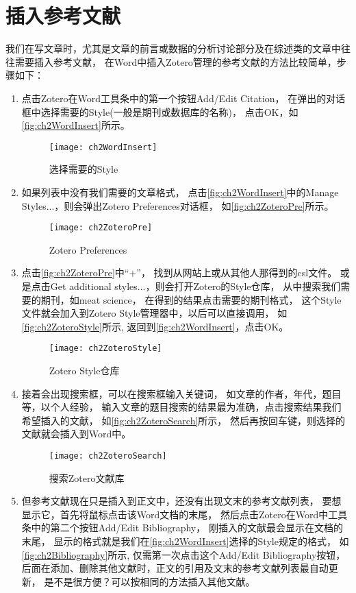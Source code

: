 \documentclass[cn,11pt,chinese]{elegantbook}
\begin{document}
		\section{插入参考文献}\label{sec:insertRef}
		我们在写文章时，尤其是文章的前言或数据的分析讨论部分及在综述类的文章中往往需要插入参考文献，
		在Word中插入Zotero管理的参考文献的方法比较简单，步骤如下：
		\begin{enumerate}
			\item
			点击Zotero在Word工具条中的第一个按钮Add/Edit Citation，
			在弹出的对话框中选择需要的Style(一般是期刊或数据库的名称)，
			点击OK，如\autoref{fig:ch2WordInsert}所示。
			\begin{figure}[htbp]
				\centering
				\texttt{[image: ch2WordInsert]}
				\caption{选择需要的Style}
				\label{fig:ch2WordInsert}
			\end{figure}
			\item
			如果列表中没有我们需要的文章格式\label{tag:notyle}，
			点击\autoref{fig:ch2WordInsert}中的Manage Styles...，则会弹出Zotero Preferences对话框，
			如\autoref{fig:ch2ZoteroPre}所示。
			\begin{figure}[htbp]
				\centering
				\texttt{[image: ch2ZoteroPre]}
				\caption{Zotero Preferences}
				\label{fig:ch2ZoteroPre}
			\end{figure}
			\item
			点击\autoref{fig:ch2ZoteroPre}中“+”，
			找到从网站上或从其他人那得到的csl文件。
			或是点击Get additional styles...，则会打开Zotero的Style仓库，
			从中搜索我们需要的期刊，如meat science，
			在得到的结果点击需要的期刊格式，
			这个Style文件就会加入到Zotero Style管理器中，以后可以直接调用，
			如\autoref{fig:ch2ZoteroStyle}所示,
			返回到\autoref{fig:ch2WordInsert}，点击OK。
			\begin{figure}[htbp]
				\centering
				\texttt{[image: ch2ZoteroStyle]}
				\caption{Zotero Style仓库}
				\label{fig:ch2ZoteroStyle}
			\end{figure}
			\item
			接着会出现搜索框，可以在搜索框输入关键词，
			如文章的作者，年代，题目等，以个人经验，
			输入文章的题目搜索的结果最为准确，点击搜索结果我们希望插入的文献，
			如\autoref{fig:ch2ZoteroSearch}所示，
			然后再按回车键，则选择的文献就会插入到Word中。
			\begin{figure}[htbp]
				\centering
				\texttt{[image: ch2ZoteroSearch]}
				\caption{搜索Zotero文献库}
				\label{fig:ch2ZoteroSearch}
			\end{figure}
			\item
			但参考文献现在只是插入到正文中，还没有出现文末的参考文献列表，
			要想显示它，首先将鼠标点击该Word文档的末尾，
			然后点击Zotero在Word中工具条中的第二个按钮Add/Edit Bibliography，
			刚插入的文献最会显示在文档的末尾，
			显示的格式就是我们在\autoref{fig:ch2WordInsert}选择的Style规定的格式，
			如\autoref{fig:ch2Bibliography}所示,
			仅需第一次点击这个Add/Edit Bibliography按钮，
			后面在添加、删除其他文献时，正文的引用及文末的参考文献列表最自动更新，
			是不是很方便？可以按相同的方法插入其他文献。
			

\end{enumerate}
\end{document}

